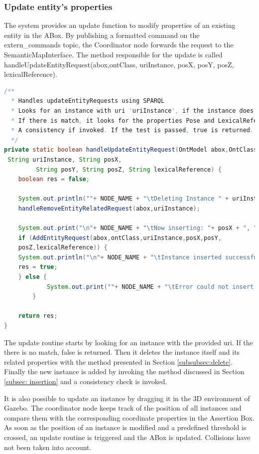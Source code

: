 \subsubsection{Update entity's properties}
The system provides an update function to modify properties of an existing entity in the ABox. By publishing a formatted command on the extern\_commands topic, the Coordinator node forwards the request to the SemanticMapInterface. The method responsible for the update is called handleUpdateEntityRequest(abox,ontClass, uriInstance, posX, posY, posZ,  lexicalReference).

\begin{lstlisting}[language=Java]
/**
  * Handles updateEntityRequests using SPARQL
  *	Looks for an instance with uri 'uriInstance', if the instance does not exist returns flase.
  * If there is match, it looks for the properties Pose and LexicalReference and updates it. 
  * A consistency if invoked. If the test is passed, true is returned. Otherwise False.
  */
private static boolean handleUpdateEntityRequest(OntModel abox,OntClass ontClass,
 String uriInstance, String posX,
		 String posY, String posZ, String lexicalReference) {
	boolean res = false;

	System.out.println(""+ NODE_NAME + "\tDeleting Instance " + uriInstance);
	handleRemoveEntityRelatedRequest(abox,uriInstance);

	System.out.print("\n"+ NODE_NAME + "\tNow inserting: "+ posX + ", " + posY + " , " + posZ);
	if (AddEntityRequest(abox,ontClass,uriInstance,posX,posY,
	posZ,lexicalReference)) {
	System.out.println("\n"+ NODE_NAME + "\tInstance inserted successfully");
	res = true;
   	} else {
    		System.out.print(""+ NODE_NAME + "\tError could not insert instance consistency problem");
    	}
	
	return res;
}
\end{lstlisting}

The update routine starts by looking for an instance with the provided uri. If the there is no match, false is returned. Then it deletes the instance itself and its related properties with the method presented in Section \ref{subsubsec:delete}. Finally the new instance is added by invoking the method discussed in Section \ref{subsec: insertion} and a consistency check is invoked. 

It is also possible to update an instance by dragging it in the 3D environment of Gazebo. The coordinator node keeps track of the position of all instances and compare them with the corresponding coordinate properties in the Assertion Box. As soon as the position of an instance is modified and a predefined threshold is crossed, an update routine is triggered and the ABox is updated. Collisions have not been taken into account.

